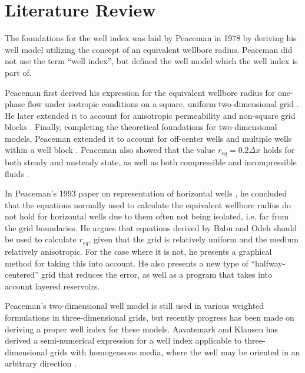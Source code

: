 
\section{Literature Review} %
\label{sec:literature_review}
The foundations for the well index was laid by Peaceman in 1978 \cite{Aavatsmark2003Well} by deriving his well model utilizing the concept of an equivalent wellbore radius. Peaceman did not use the term ``well index'', but defined the well model which the well index is part of.

Peaceman first derived his expression for the equivalent wellbore radius for one-phase flow under isotropic conditions on a square, uniform two-dimensional grid \cite{Peaceman1978Interpretation}. He later extended it to account for anisotropic permeability and non-square grid blocks \cite{Peaceman1983Interpretation}. Finally, completing the theoretical foundations for two-dimensional models, Peaceman extended it to account for off-center wells and multiple wells within a well block \cite{Peaceman1990Interpretation}. Peaceman also showed that the value $r_{eq}=0.2 \Delta x$ holds for both steady and unsteady state, as well as both compressible and incompressible fluids \cite{Peaceman1978Interpretation}.

In Peaceman's 1993 paper on representation of horizontal wells \cite{Peaceman1993Representation}, he concluded that the equations normally used to calculate the equivalent wellbore radius do not hold for horizontal wells due to them often not being isolated, i.e. far from the grid boundaries. He argues that equations derived by Babu and Odeh \cite{Babu1991Relation} should be used to calculate $r_{eq}$, given that the grid is relatively uniform and the medium relatively anisotropic. For the case where it is not, he presents a graphical method for taking this into account. He also presents a new type of ``halfway-centered'' grid that reduces the error, as well as a program that takes into account layered reservoirs.

Peaceman's two-dimensional well model is still used in various weighted formulations in three-dimensional grids, but recently progress has been made on deriving a proper well index for these models. Aavatsmark and Klausen has derived a semi-numerical expression for a well index applicable to three-dimensional grids with homogeneous media, where the well may be oriented in an arbitrary direction \cite{Aavatsmark2003Well}.

